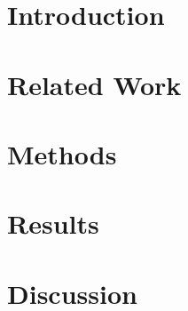 \documentclass[fleqn,moreauthors,10pt]{ds_report}
\affiliation{\textit{Advisors: Slavko Žitnik}}
\begin{document}
\flushbottom 

\maketitle 

\thispagestyle{empty} 

\section*{Introduction}

\section*{Related Work}

\section*{Methods}

\section*{Results}

\section*{Discussion}



\end{document}

